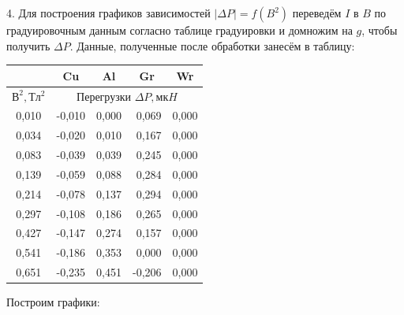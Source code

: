 \documentclass[11pt]{article}
\begin{document}
4. Для построения графиков зависимостей $ |\Delta P| = f(B^2) $ переведём $ I $ в $ B $ по градуировочным данным согласно таблице градуировки и домножим на $g$, чтобы получить $\Delta P$. Данные, полученные после обработки занесём в таблицу:

\begin{table}[!ht]
\centering
\begin{tabular}{|c|cccc|}
\hline
\multicolumn{1}{|l|}{\textbf{}} & \multicolumn{1}{c|}{\cellcolor[HTML]{FFFFFF}Cu} & \multicolumn{1}{c|}{\cellcolor[HTML]{FFFFFF}Al} & \multicolumn{1}{c|}{\cellcolor[HTML]{FFFFFF}Gr} & \multicolumn{1}{c|}{\cellcolor[HTML]{FFFFFF}Wr} \\ \hline
\textbf{$В^2, Тл^2$} & \multicolumn{4}{c|}{\cellcolor[HTML]{FFFFFF}Перегрузки $\Delta P, мкH$} \\ \hline
0,010 & \multicolumn{1}{r|}{-0,010} & \multicolumn{1}{r|}{0,000} & \multicolumn{1}{r|}{0,069} & 0,000 \\ \hline
0,034 & \multicolumn{1}{r|}{-0,020} & \multicolumn{1}{r|}{0,010} & \multicolumn{1}{r|}{0,167} & 0,000 \\ \hline
0,083 & \multicolumn{1}{r|}{-0,039} & \multicolumn{1}{r|}{0,039} & \multicolumn{1}{r|}{0,245} & 0,000 \\ \hline
0,139 & \multicolumn{1}{r|}{-0,059} & \multicolumn{1}{r|}{0,088} & \multicolumn{1}{r|}{0,284} & 0,000 \\ \hline
0,214 & \multicolumn{1}{r|}{-0,078} & \multicolumn{1}{r|}{0,137} & \multicolumn{1}{r|}{0,294} & 0,000 \\ \hline
0,297 & \multicolumn{1}{r|}{-0,108} & \multicolumn{1}{r|}{0,186} & \multicolumn{1}{r|}{0,265} & 0,000 \\ \hline
0,427 & \multicolumn{1}{r|}{-0,147} & \multicolumn{1}{r|}{0,274} & \multicolumn{1}{r|}{0,157} & 0,000 \\ \hline
0,541 & \multicolumn{1}{r|}{-0,186} & \multicolumn{1}{r|}{0,353} & \multicolumn{1}{r|}{0,000} & 0,000 \\ \hline
0,651 & \multicolumn{1}{r|}{-0,235} & \multicolumn{1}{r|}{0,451} & \multicolumn{1}{r|}{-0,206} & 0,000 \\ \hline
\end{tabular}
\end{table}


Построим графики:
\end{document}
